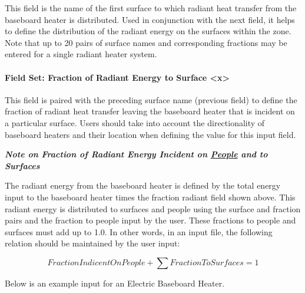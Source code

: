 This field is the name of the first surface to which radiant heat transfer from the baseboard heater is distributed. Used in conjunction with the next field, it helps to define the distribution of the radiant energy on the surfaces within the zone. Note that up to 20 pairs of surface names and corresponding fractions may be entered for a single radiant heater system.

\paragraph{Field Set: Fraction of Radiant Energy to Surface \textless{}x\textgreater{}}\label{field-set-fraction-of-radiant-energy-to-surface-x}

This field is paired with the preceding surface name (previous field) to define the fraction of radiant heat transfer leaving the baseboard heater that is incident on a particular surface. Users should take into account the directionality of baseboard heaters and their location when defining the value for this input field.

\textbf{\emph{Note on Fraction of Radiant Energy Incident on \hyperref[people]{People} and to Surfaces}}

The radiant energy from the baseboard heater is defined by the total energy input to the baseboard heater times the fraction radiant field shown above. This radiant energy is distributed to surfaces and people using the surface and fraction pairs and the fraction to people input by the user. These fractions to people and surfaces must add up to 1.0. In other words, in an input file, the following relation should be maintained by the user input:

\begin{equation}
FractionIndicentOnPeople + \sum {FractionToSurfaces = 1}
\end{equation}

Below is an example input for an Electric Baseboard Heater.

